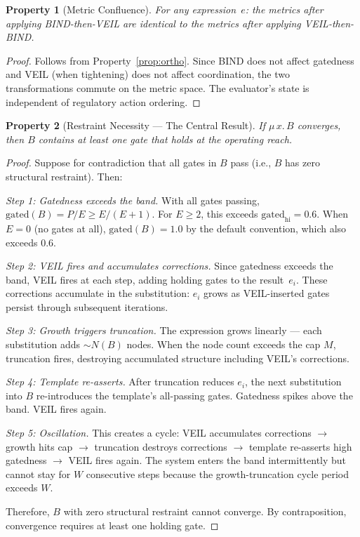 \documentclass[sigconf,nonacm]{acmart}
\newtheorem{property}{Property}
\begin{document}
\begin{property}[Metric Confluence]\label{prop:confluence}
For any expression~$e$: the metrics after applying BIND-then-VEIL
are identical to the metrics after applying VEIL-then-BIND.
\end{property}
\begin{proof}
Follows from Property~\ref{prop:ortho}. Since BIND does not affect
gatedness and VEIL (when tightening) does not affect coordination,
the two transformations commute on the metric space. The evaluator's
state is independent of regulatory action ordering.
\end{proof}

\begin{property}[Restraint Necessity --- The Central Result]\label{prop:restraint}
If $\mu\,x.\,B$ converges, then $B$ contains at least one gate
that holds at the operating reach.
\end{property}
\begin{proof}
Suppose for contradiction that all gates in $B$ pass (i.e., $B$ has
zero structural restraint). Then:

\emph{Step 1: Gatedness exceeds the band.}
With all gates passing, $\mathrm{gated}(B) = P/E \geq E/(E+1)$.
For $E \geq 2$, this exceeds $\mathrm{gated}_{\mathrm{hi}} = 0.6$.
When $E = 0$ (no gates at all), $\mathrm{gated}(B) = 1.0$ by the
default convention, which also exceeds 0.6.

\emph{Step 2: VEIL fires and accumulates corrections.}
Since gatedness exceeds the band, VEIL fires at each step, adding
holding gates to the result~$e_i$. These corrections accumulate in
the substitution: $e_i$ grows as VEIL-inserted gates persist through
subsequent iterations.

\emph{Step 3: Growth triggers truncation.}
The expression grows linearly --- each substitution adds $\sim N(B)$
nodes. When the node count exceeds the cap $M$, truncation fires,
destroying accumulated structure including VEIL's corrections.

\emph{Step 4: Template re-asserts.}
After truncation reduces $e_i$, the next substitution into $B$
re-introduces the template's all-passing gates. Gatedness spikes
above the band. VEIL fires again.

\emph{Step 5: Oscillation.}
This creates a cycle: VEIL accumulates corrections $\to$ growth hits
cap $\to$ truncation destroys corrections $\to$ template re-asserts
high gatedness $\to$ VEIL fires again. The system enters the band
intermittently but cannot stay for $W$ consecutive steps because the
growth-truncation cycle period exceeds $W$.

Therefore, $B$ with zero structural restraint cannot converge. By
contraposition, convergence requires at least one holding gate.
\end{proof}
\end{document}
